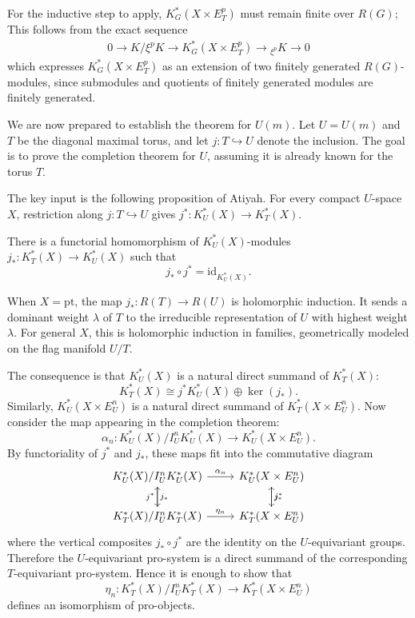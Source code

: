 \documentclass[12pt]{article}
\begin{document}
For the inductive step to apply, $K_G^*(X\times E_T^p)$ must
remain finite over $R(G)$; This follows from the exact sequence \begin{align*}
    0
\longrightarrow
K/\xi^pK
\longrightarrow
K_G^*(X\times E_T^p)
\longrightarrow
{}_{\xi^p}K
\longrightarrow
0
\end{align*} which expresses $K_G^*(X\times E_T^p)$ as an extension of two finitely generated $R(G)$-modules, since submodules and quotients of finitely generated modules are finitely generated.

We are now prepared to establish the theorem for $U(m)$. Let $U = U(m)$ and $T$ be the diagonal maximal torus, and let $j:T\hookrightarrow U$
denote the inclusion. The goal is to prove the completion theorem for $U$,
assuming it is already known for the torus $T$.

The key input is the following proposition of Atiyah. 
For every compact $U$-space $X$, restriction along $j:T\hookrightarrow U$
gives $j^*:K_U^*(X)\longrightarrow K_T^*(X)$.

\begin{proposition}[Atiyah]\label{prop:atiyah}
There is a functorial homomorphism of $K_U^*(X)$-modules $j_*:K_T^*(X)\longrightarrow K_U^*(X)$ such that
\[
    j_*\circ j^*=\mathrm{id}_{K_U^*(X)}.
\]
\end{proposition}

When $X=\mathrm{pt}$, the map $j_*:R(T)\to R(U)$
is holomorphic induction. It sends a dominant weight $\lambda$ of $T$ to the
irreducible representation of $U$ with highest weight $\lambda$. For general
$X$, this is holomorphic induction in families, geometrically modeled on the
flag manifold $U/T$.

The consequence is that $K_U^*(X)$ is a natural direct summand of $K_T^*(X)$:
\[
    K_T^*(X)\cong j^*K_U^*(X)\oplus \ker(j_*).
\]
Similarly, $K_U^*(X\times E_U^n)$
is a natural direct summand of $K_T^*(X\times E_U^n)$. Now consider the map appearing in the completion theorem:
\[
    \alpha_n:
    K_U^*(X)/I_U^nK_U^*(X)
    \longrightarrow
    K_U^*(X\times E_U^n).
\]
By functoriality of $j^*$ and $j_*$, these maps fit into the commutative
diagram
\[
\begin{tikzcd}
K_U^*(X)/I_U^nK_U^*(X)
    \arrow[r,"\alpha_n"]
    \arrow[d,"j^*"']
&
K_U^*(X\times E_U^n)
    \arrow[d,"j^*"]
\\
K_T^*(X)/I_U^nK_T^*(X)
    \arrow[r,"\eta_n"]
    \arrow[u,"j_*"']
&
K_T^*(X\times E_U^n)
    \arrow[u,"j_*"']
\end{tikzcd}
\]
where the vertical composites $j_*\circ j^*$ are the identity on the
$U$-equivariant groups. Therefore the $U$-equivariant pro-system is a direct
summand of the corresponding $T$-equivariant pro-system. Hence it is enough to
show that
\[
    \eta_n:
    K_T^*(X)/I_U^nK_T^*(X)
    \longrightarrow
    K_T^*(X\times E_U^n)
\]
defines an isomorphism of pro-objects.
\end{document}
